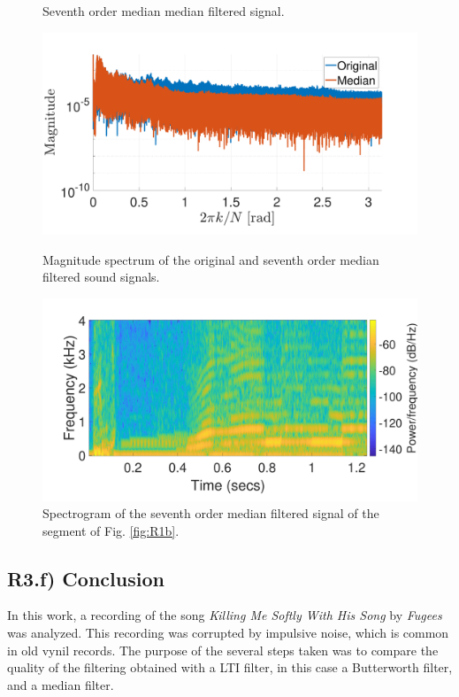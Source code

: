 \documentclass[a4paper, oneside, 11pt]{article}
\begin{document}
\begin{figure}[htbp]
\begin{minipage}[b]{.49\textwidth}
		\caption{Seventh order median median filtered signal.}
		\label{fig:comp_median7_zoom_in}
	\end{minipage}
	\hfill
	\begin{minipage}[b]{.49\textwidth}
		\centering
		\includegraphics[width= 1.1\textwidth]{figures/dft_comp_median7.pdf}
		\caption{Magnitude spectrum of the original and seventh order median filtered sound signals.}
		\label{fig:dft_comp_median7}
	\end{minipage}
    \begin{minipage}[b]{.49\textwidth}
    	\centering
    	\includegraphics[width= 1.1\textwidth]{figures/spectrogram_median7.pdf}
    	\caption{Spectrogram of the seventh order median filtered signal of the segment of Fig. \ref{fig:R1b}.}
    	\label{fig:spectrogram_median7}
    \end{minipage}
\end{figure}

\subsection{R3.f) Conclusion}

In this work, a recording of the song \textit{Killing Me Softly With His Song} by \textit{Fugees} was analyzed. This recording was corrupted by impulsive noise, which is common in old vynil records. The purpose of the several steps taken was to compare the quality of the filtering obtained with a LTI filter, in this case a Butterworth filter, and a median filter. 
\end{document}
